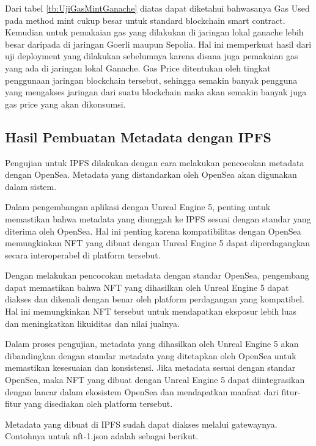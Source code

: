 \begin{enumerate}
        Dari tabel \ref{tb:UjiGasMintGanache} diatas dapat diketahui bahwasanya Gas Used pada method mint cukup besar untuk standard
        blockchain smart contract. Kemudian untuk pemakaian gas yang dilakukan di jaringan lokal ganache lebih besar daripada di jaringan Goerli
        maupun Sepolia. Hal ini memperkuat hasil dari uji deployment yang dilakukan sebelumnya karena disana juga pemakaian gas yang ada di jaringan lokal
        Ganache. Gas Price ditentukan oleh tingkat penggunaan jaringan blockchain tersebut, sehingga semakin banyak pengguna yang mengakses jaringan dari suatu
        blockchain maka akan semakin banyak juga gas price yang akan dikonsumsi.
\end{enumerate}


\subsection{Hasil Pembuatan Metadata dengan IPFS}
Pengujian untuk IPFS dilakukan dengan cara melakukan pencocokan metadata dengan OpenSea. Metadata yang distandarkan oleh OpenSea akan digunakan dalam sistem.

Dalam pengembangan aplikasi dengan Unreal Engine 5, penting untuk memastikan bahwa metadata yang diunggah ke IPFS sesuai dengan standar yang diterima oleh OpenSea. Hal ini penting karena kompatibilitas dengan OpenSea memungkinkan NFT yang dibuat dengan Unreal Engine 5 dapat diperdagangkan secara interoperabel di platform tersebut.

Dengan melakukan pencocokan metadata dengan standar OpenSea, pengembang dapat memastikan bahwa NFT yang dihasilkan oleh Unreal Engine 5 dapat diakses dan dikenali dengan benar oleh platform perdagangan yang kompatibel. Hal ini memungkinkan NFT tersebut untuk mendapatkan eksposur lebih luas dan meningkatkan likuiditas dan nilai jualnya.

Dalam proses pengujian, metadata yang dihasilkan oleh Unreal Engine 5 akan dibandingkan dengan standar metadata yang ditetapkan oleh OpenSea untuk memastikan kesesuaian dan konsistensi. Jika metadata sesuai dengan standar OpenSea, maka NFT yang dibuat dengan Unreal Engine 5 dapat diintegrasikan dengan lancar dalam ekosistem OpenSea dan mendapatkan manfaat dari fitur-fitur yang disediakan oleh platform tersebut.

Metadata yang dibuat di IPFS sudah dapat diakses melalui gatewaynya. Contohnya untuk nft-1.json adalah sebagai berikut.

